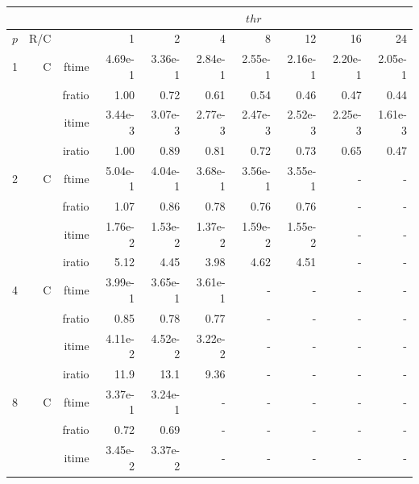 \documentclass[a4paper]{article}
\begin{document}
\begin{table}[htbp]
\begin{center}
\begin{small}
\begin{tabular}{|r|r|r|r|r|r|r|r|r|r|}
\hline 
     & & & \multicolumn{7}{c|}{$thr$} \\ \hline
    $p$ & R/C &  & 1           & 2    & 4    & 8    & 12   & 16    & 24  \\ \hline\hline
   1 &   C &  ftime &    4.69e-1 &    3.36e-1 &    2.84e-1 &    2.55e-1 &    2.16e-1 &    2.20e-1 &    2.05e-1 \\
             &             &  fratio &    1.00 &   0.72 &   0.61 &    0.54 &    0.46 &    0.47 &    0.44 \\
             &             &  itime &    3.44e-3 &    3.07e-3 &    2.77e-3 &    2.47e-3 &    2.52e-3 &    2.25e-3 &    1.61e-3 \\
             &             &  iratio &    1.00 &    0.89 &   0.81 &   0.72 &    0.73 &    0.65 &    0.47 \\\hline
   2 &  C &  ftime &    5.04e-1 &    4.04e-1 &    3.68e-1 &    3.56e-1 &    3.55e-1 &      - &      - \\
             &             &  fratio &    1.07  &    0.86 &    0.78 &    0.76 &    0.76 &      - &      - \\
             &             &  itime &    1.76e-2 &    1.53e-2 &    1.37e-2 &    1.59e-2 &    1.55e-2 &      - &      - \\
             &             &  iratio &    5.12  &   4.45  &    3.98  &    4.62  &    4.51  &      - &      - \\\hline
   4 &  C &  ftime &    3.99e-1 &    3.65e-1 &    3.61e-1 &      - &      - &      - &      - \\
             &             &  fratio &    0.85 &    0.78 &    0.77 &      - &      - &      - &      - \\
             &             &  itime &    4.11e-2 &    4.52e-2 &    3.22e-2 &      - &      - &      - &      - \\
             &             &  iratio &    11.9 &   13.1 &   9.36  &      - &      - &      - &      - \\\hline
   8 &   C &  ftime &    3.37e-1 &    3.24e-1 &      - &      - &      - &      - &      - \\
             &             &  fratio &   0.72 &    0.69 &      - &      - &      - &      - &      - \\
             &             &  itime &    3.45e-2 &    3.37e-2 &      - &      - &      - &      - &      - \\

\end{tabular}
\end{small}
\end{center}
\end{table}
\end{document}
